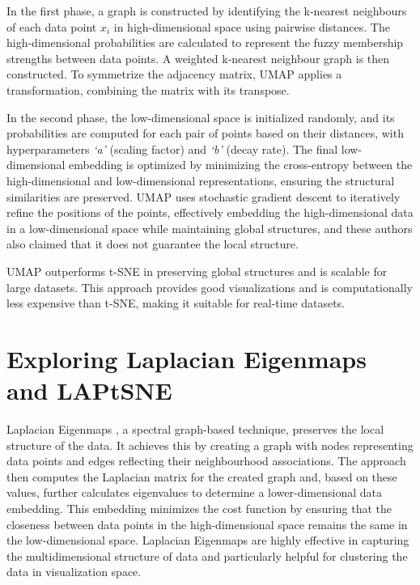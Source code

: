 In the first phase, a graph is constructed by identifying the k-nearest neighbours of each data point $x_i$ in high-dimensional space using pairwise distances. The high-dimensional probabilities are calculated to represent the fuzzy membership strengths between data points. A weighted k-nearest neighbour graph is then constructed. To symmetrize the adjacency matrix, UMAP applies a transformation, combining the matrix with its transpose.


In the second phase, the low-dimensional space is initialized randomly, and its probabilities are computed for each pair of points based on their distances, with hyperparameters \textit{`a'} (scaling factor) and \textit{`b'} (decay rate). The final low-dimensional embedding is optimized by minimizing the cross-entropy between the high-dimensional and low-dimensional representations, ensuring the structural similarities are preserved. UMAP \cite{umap_reference} uses stochastic gradient descent to iteratively refine the positions of the points, effectively embedding the high-dimensional data in a low-dimensional space while maintaining global structures, and these authors also claimed that it does not guarantee the local structure.


UMAP \cite{umap_reference} outperforms t-SNE \cite{tsne} in preserving global structures and is scalable for large datasets. This approach provides good visualizations and is computationally less expensive than t-SNE, making it suitable for real-time datasets.


\section{Exploring Laplacian Eigenmaps and LAPtSNE}

Laplacian Eigenmaps \cite{belkin2001laplacian}, a spectral graph-based technique, preserves the local structure of the data. It achieves this by creating a graph with nodes representing data points and edges reflecting their neighbourhood associations. The approach then computes the Laplacian matrix for the created graph and, based on these values, further calculates eigenvalues to determine a lower-dimensional data embedding. This embedding minimizes the cost function by ensuring that the closeness between data points in the high-dimensional space remains the same in the low-dimensional space. Laplacian Eigenmaps are highly effective in capturing the multidimensional structure of data and particularly helpful for clustering the data in visualization space. 

